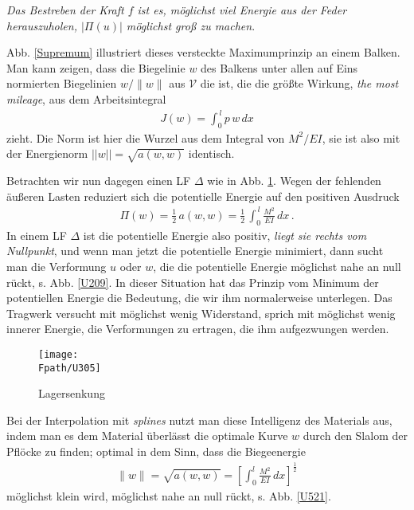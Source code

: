{{{{{{\em Das Bestreben der Kraft $ f $ ist es, m\"{o}glichst viel Energie aus der Feder herauszuholen, $|\Pi(u)|$ m\"{o}glichst gro{\ss} zu machen\/}.

Abb. \ref{Supremum} illustriert dieses versteckte Maximumprinzip an einem Balken. Man kann zeigen, dass die Biegelinie $w$ des Balkens unter allen auf Eins normierten Biegelinien $w/\|w\|$ aus $\mathcal{V}$ die ist, die die gr\"{o}{\ss}te Wirkung, {\em the most mileage\/}, aus dem Arbeitsintegral
\begin{align}
J(w) = \int_0^{\,l} p\,w\,dx
\end{align}
zieht. Die Norm ist hier die Wurzel aus dem Integral von $M^2/EI$, sie ist also mit der Energienorm $||w|| = \sqrt{a(w,w)}$ identisch.

Betrachten wir nun dagegen einen LF $\Delta$ wie in Abb. \ref{U305}. Wegen der fehlenden \"{a}u{\ss}eren Lasten reduziert sich die potentielle Energie auf den positiven Ausdruck
\begin{align}
\Pi(w)= \frac{1}{2}\,a(w,w) = \frac{1}{2}\, \int_0^{\,l} \frac{M^2}{EI}\,dx\,.
\end{align}
In einem LF $\Delta$ ist die potentielle Energie also positiv, {\em liegt sie rechts vom Nullpunkt\/}, und wenn man jetzt die potentielle Energie minimiert, dann sucht man die Verformung $ u $ oder $w$, die die potentielle Energie m\"{o}glichst nahe an null r\"{u}ckt, s. Abb. \ref{U209}. In dieser Situation hat das Prinzip vom Minimum der potentiellen Energie die Bedeutung, die wir ihm normalerweise unterlegen. Das Tragwerk versucht mit m\"{o}glichst wenig Widerstand, sprich mit m\"{o}glichst wenig innerer Energie, die Verformungen zu ertragen, die ihm aufgezwungen werden.
\begin{figure}[tbp]
\centering
\if {} \sidecaption \fi
\texttt{[image: \\Fpath/U305]}
\caption{Lagersenkung }
\label{U305}
\end{figure}%

Bei der Interpolation mit {\em splines\/} nutzt man diese Intelligenz des Materials aus, indem man es dem Material \"{u}berl\"{a}sst die optimale Kurve $w$ durch den Slalom der Pfl\"{o}cke zu finden; optimal in dem Sinn, dass die Biegeenergie
\begin{align}
\|w\| = \sqrt{a(w,w)} = \left[ \int_{0}^{l}\frac{M^2}{EI}\,dx \right]^{\frac{1}{2}}
\end{align}
m\"{o}glichst klein wird, m\"{o}glichst nahe an null r\"{u}ckt, s. Abb. \ref{U521}.

}}}}}
